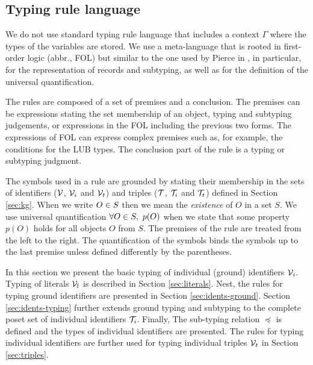 \documentclass[runningheads]{llncs}
\newcommand{\V}{{\cal V}}
\newcommand{\T}{{\cal T}}
\newcommand{\memo}[1]{}
\begin{document}
\subsection{Typing rule language}

\memo{
In this paper we define typing of a data language used to represent an
ABOX \cite{Brachman2004KnowledgeRR} of a knowledge base given in a
form of a knowledge graph. The data language specifys the assertions
in the form of ground triples (ABOX) and the schema of assertions as
the types of triples (TBOX). The ground triples are the instances of
the triple types that altogether define the schema of a KG.}

We do not use standard typing rule language
\cite{Pierce2002,Hindley1997} that includes a context $\Gamma$ where
the types of the variables are stored. We use a meta-language that is
rooted in first-order logic (abbr., FOL) but similar to the one used
by Pierce in \cite{Pierce2002}, in particular, for the representation
of records and subtyping, as well as for the definition of the
universal quantification.

The rules are composed of a set of premises and a conclusion. The
premises can be expressions stating the set membership of an object,
typing and subtyping judgements, or expressions in the FOL including
the previous two forms. The expressions of FOL can express complex
premises such as, for example, the conditions for the LUB types. The
conclusion part of the rule is a typing or subtyping judgment.

The symbols used in a rule are grounded by stating their membership in
the sets of identifiers ($\V$, $\V_i$ and $\V_t$) and triples ($\T$,
$\T_i$ and $\T_t$) defined in Section \ref{sec:kg}. When we write
$O\in\/S$ then we mean the \emph{existence} of $O$ in a set $S$. We
use universal quantification $\forall\/O\in\/S,\ p(O)$ when we state
that some property $p(O)$ holds for all objects $O$ from $S$. The
premises of the rule are treated from the left to the right. The
quantification of the symbols binds the symbols up to the last premise
unless defined differently by the parentheses.

\memo{
Similar to \cite{Dunfield2021}, we differ between two interpretations
of rules. First, the \emph{generator} view of rules is the forward
interpretation where rules infer the types from the types derived by
premises. Second, the \emph{type-checking} view of the rules is the
backward interpretation. Given the expression and its type, the rules
are applied backwards to verify that the expression has that type.}
In this section we present the basic typing of individual (ground)
identifiers $\V_i$. Typing of literals $\V_l$ is described in Section
\ref{sec:literals}. Nest, the rules for typing ground identifiers are
presented in Section \ref{sec:idents-ground}. Section
\ref{sec:idents-typing} further extends ground typing and subtyping to
the complete poset set of individual identifiers $\T_i$. Finally, The
sub-typing relation $\preceq$ is defined and the types of individual
identifiers are presented. The rules for typing individual identifiers
are further used for typing individual triples $\V_t$ in Section
\ref{sec:triples}.
\end{document}
